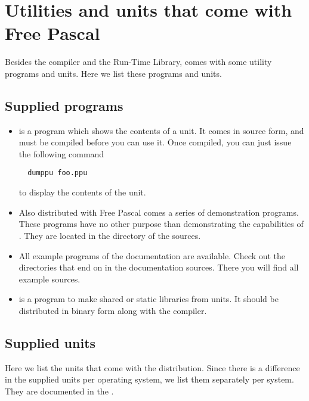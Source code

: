\documentclass{report}
\begin{document}

\chapter{Utilities and units that come with Free Pascal}
\label{ch:Utilities}
Besides the compiler and the Run-Time Library, \fpc comes with some utility
programs and units. Here we list these programs and units. 

\section{Supplied programs}

\begin{itemize}
\item {} is a program which shows the contents of a \fpc unit. It
comes in source form, and must be compiled before you can use it. Once
compiled, you can just issue the following command
\begin{verbatim}
  dumppu foo.ppu
\end{verbatim}
to display the contents of the  unit.
\item Also distributed with Free Pascal comes a series of demonstration programs.
These programs have no other purpose than demonstrating the capabilities of
\fpc. They are located in the  directory of the sources.
\item All example programs of the documentation are available. Check out the
directories that end on  in the documentation sources. There you
will find all example sources.
\item {} is a program to make shared or static libraries from
units. It should be distributed in binary form along with the compiler.
\end{itemize}


\section{Supplied units}
Here we list the units that come with the \fpc distribution. Since there is
a difference in the supplied units per operating system, we list them
separately per system. They are documented in the \unitsref.
\end{document}
